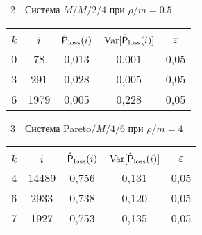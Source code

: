 \begin{multicols}{2}

\vspace*{6pt}

\addtocounter{figure}{1}

\noindent
\begin{center}  %
{{\tablename~2}\ \ \small{Система $M/M/2/4$  при $\rho/m=0.5$}}
\vspace*{2ex}

{\small 
\tabcolsep=6.4pt
\begin{tabular}{|c|c|c|c|c|} 
\hline
&&&&\\[-9pt]
 $k$ & $i$   &$\hat{{\sf P}}_{\mathrm{loss}}(i)$ &  $\mathrm{Var}[\hat{{\sf P}}_{\mathrm{loss}}(i)]$ & $\varepsilon$ \\
 \hline
0& \hphantom{9,}78\hphantom{9}& 0,013& 0,001& 0,05\\ 
3& 291& 0,028& 0,005& 0,05\\ 
6& 1979\hphantom{9}& 0,005& 0,228&0,05\\
 \hline
\end{tabular} 
}
\end{center}





\addtocounter{table}{1}


\noindent
\begin{center}  %
{{\tablename~3}\ \ \small{Система
Pareto$/M/4/6$  при $\rho/m=4$}}
\vspace*{2ex}

{\small 
\tabcolsep=7pt
\begin{tabular}{|c|c|c|c|c|}
\hline
&&&&\\[-9pt]
 $k$ & $i$   &$\hat{{\sf P}}_{\mathrm{loss}}(i)$ &  $\mathrm{Var}[\hat{{\sf P}}_{\mathrm{loss}}(i)]$ & $\varepsilon$ \\
 \hline
4& 14489\hphantom{9}& 0,756& 0,131& 0,05\\ 
6& 2933& 0,738& 0,120& 0,05\\ 
7& 1927& 0,753& 0,135& 0,05\\
 \hline
\end{tabular} 
}
\end{center}




\end{multicols}
